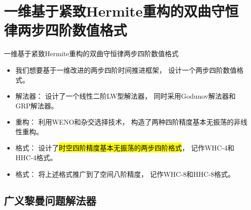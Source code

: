 \documentclass[aspectratio=169]{beamer}
\begin{document}
\section[一维两步四阶数值格式]{一维基于紧致Hermite重构的双曲守恒律两步四阶数值格式}

\begin{frame}{一维基于紧致Hermite重构的双曲守恒律两步四阶数值格式}
  
  \begin{itemize}[<+->]
    \item 我们想要基于一维改进的两步四阶时间推进框架，
          设计一个两步四阶数值格式。
          
    \item 解法器：
          设计了一个线性二阶LW型解法器，
          同时采用Godunov解法器和GRP解法器。
          
    \item 重构：
          利用WENO和杂交选择技术，
          构造了两种四阶精度基本无振荡的非线性重构。
          
    \item 格式：
          设计了\hl{时空四阶精度基本无振荡的两步四阶格式}，
          记作WHC-4和HHC-4格式。
          
    \item 格式：
          将上述格式推广到了空间八阶精度，
          记作WHC-8和HHC-8格式。
  \end{itemize}
  
\end{frame}

\subsection{广义黎曼问题解法器}
\end{document}

